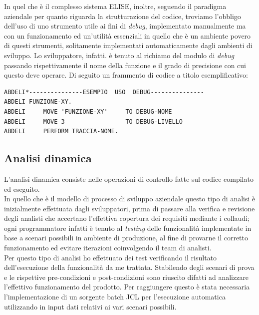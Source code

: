 In quel che è il complesso sistema ELISE, inoltre, seguendo il paradigma aziendale per quanto riguarda la strutturazione del codice, troviamo l'obbligo dell'uso di uno strumento utile ai fini di \textit{debug}, implementato manualmente ma con un funzionamento ed un'utilità essenziali in quello che è un ambiente povero di questi strumenti, solitamente implementati automaticamente dagli ambienti di sviluppo. Lo sviluppatore, infatti. è tenuto al richiamo del modulo di \textit{debug} passando rispettivamente il nome della funzione e il grado di precisione con cui questo deve operare. Di seguito un frammento di codice a titolo esemplificativo:
	\begin{lstlisting}[language=cobol, caption={Modalità di \textit{debugging} secondo la prassi aziendale}]
ABDELI*---------------ESEMPIO  USO  DEBUG---------------
ABDELI FUNZIONE-XY.
ABDELI     MOVE 'FUNZIONE-XY'     TO DEBUG-NOME
ABDELI     MOVE 3                 TO DEBUG-LIVELLO
ABDELI     PERFORM TRACCIA-NOME.
	\end{lstlisting}

\subsection{Analisi dinamica}
	
	L'analisi dinamica consiste nelle operazioni di controllo fatte sul codice compilato ed eseguito.\\

	In quello che è il modello di processo di sviluppo aziendale questo tipo di analisi è inizialmente effettuata dagli sviluppatori, prima di passare alla verifica e revisione degli analisti che accertano l'effettiva copertura dei requisiti mediante i collaudi; ogni programmatore infatti è tenuto al \textit{testing} delle funzionalità implementate in base a scenari possibili in ambiente di produzione, al fine di provarne il corretto funzionamento ed evitare iterazioni coinvolgendo il team di analisti.\\

	Per questo tipo di analisi ho effettuato dei test verificando il risultato dell'esecuzione della funzionalità da me trattata. Stabilendo degli scenari di prova e le rispettive pre-condizioni e post-condizioni sono riuscito difatti ad analizzare l'effettivo funzionamento del prodotto. Per raggiungere questo è stata necessaria l'implementazione di un sorgente batch JCL per l'esecuzione automatica utilizzando in input dati relativi ai vari scenari possibili.
		
